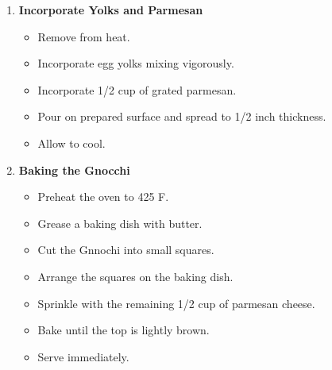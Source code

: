 \documentclass [11pt, letterpaper] {article}
\newcommand \fileName {GnocchiAllaRomana}
\begin{document}
\begin{description}
\begin{enumerate}
	\item {\bf Incorporate Yolks and Parmesan}
	\begin{itemize}
	\item Remove from heat.
	\item Incorporate egg yolks mixing vigorously.
	\item Incorporate 1/2 cup of grated parmesan.
	\item Pour on prepared surface and spread to 1/2 inch thickness.
	\item Allow to cool.
	\end{itemize}

	\item {\bf Baking the Gnocchi}
	\begin{itemize}
	\item Preheat the oven to 425 F.
	\item Grease a baking dish with butter.
	\item Cut the Gnnochi into small squares.
	\item Arrange the squares on the baking dish.
	\item Sprinkle with the remaining 1/2 cup of parmesan cheese.
	\item Bake until the top is lightly brown.
	\item Serve immediately.
	\end{itemize}

	\end{enumerate}
\end{description}

\end{document}
